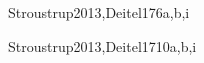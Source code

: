 \begin{syllabus}
\begin{unit}{\SDFFundamentalProgrammingConcepts}{}{Stroustrup2013,Deitel17}{6}{a,b,i}
    \begin{topics}
        \item \SDFFundamentalProgrammingConceptsTopicBasic
        \item \SDFFundamentalProgrammingConceptsTopicVariables
        \item \SDFFundamentalProgrammingConceptsTopicExpressions
        \item \SDFFundamentalProgrammingConceptsTopicSimple
        \item \SDFFundamentalProgrammingConceptsTopicConditional
        \item \SDFFundamentalProgrammingConceptsTopicFunctions
    \end{topics}
    \begin{learningoutcomes}
        \item \SDFFundamentalProgrammingConceptsLOAnalyzeAndBehavior [\Assessment]
        \item \SDFFundamentalProgrammingConceptsLOIdentifyAndOf [\Familiarity]
        \item \SDFFundamentalProgrammingConceptsLOWritePrograms [\Usage]
        \item \SDFFundamentalProgrammingConceptsLOModify [\Usage]
        \item \SDFFundamentalProgrammingConceptsLODesignImplement [\Usage]
        \item \SDFFundamentalProgrammingConceptsLOWriteAUses [\Usage]
        \item \SDFFundamentalProgrammingConceptsLOChooseAppropriateIteration [\Assessment]
        \item \SDFFundamentalProgrammingConceptsLODescribeTheRecursion [\Familiarity]
        \item \SDFFundamentalProgrammingConceptsLOIdentifyTheAndCase [\Assessment]
    \end{learningoutcomes}
\end{unit}

\begin{unit}{\PLObjectOrientedProgramming}{}{Stroustrup2013,Deitel17}{10}{a,b,i}
    \begin{topics}
        \item \PLObjectOrientedProgrammingTopicObject
        \item \PLObjectOrientedProgrammingTopicObjectOriented
        \item \PLObjectOrientedProgrammingTopicDefinition
        \item \PLObjectOrientedProgrammingTopicSubclasses
        \item \PLObjectOrientedProgrammingTopicSubtyping
        \item \PLObjectOrientedProgrammingTopicUsing
        \item \PLObjectOrientedProgrammingTopicDynamic


\end{topics}
\end{unit}
\end{syllabus}

